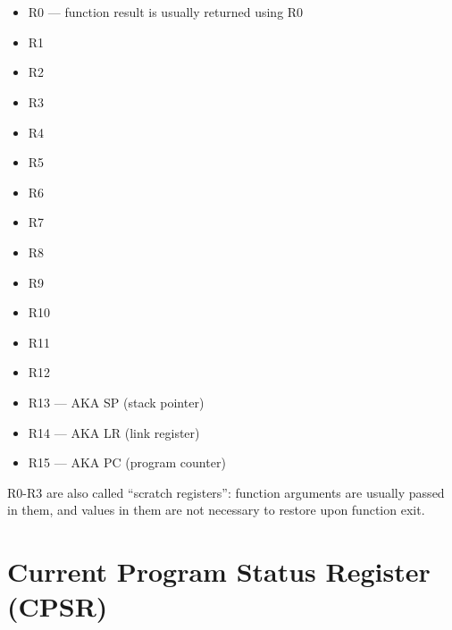 \section{}

\begin{itemize}
	\item R0 --- 
		{function result is usually returned using R0}
	\item R1
	\item R2
	\item R3
	\item R4
	\item R5
	\item R6
	\item R7
	\item R8
	\item R9
	\item R10
	\item R11
	\item R12
	\item R13 --- \ac{AKA} SP (\gls{stack pointer})
	\item R14 --- \ac{AKA} LR (\gls{link register})
	\item R15 --- \ac{AKA} PC (program counter)
\end{itemize}

{R0-R3 are also called ``scratch registers'': function arguments are usually passed in them,
and values in them are not necessary to restore upon function exit}.

\section{Current Program Status Register (CPSR)}

